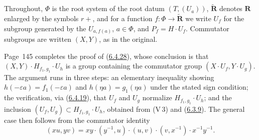 \documentclass[12pt,a4paper,oneside,english]{smfart}
\newcommand{\btref}[1]{\hyperlink{bt:#1}{#1}}
\theoremstyle{definition}
\theoremstyle{bt}
\begin{document}
\begingroup\linespread{1.06}
\providecommand{\bR}{}
\renewcommand{\bR}{\mathbf{R}}
\providecommand{\bN}{}
\renewcommand{\bN}{\mathbf{N}}
\providecommand{\bZ}{}
\renewcommand{\bZ}{\mathbf{Z}}
\providecommand{\bF}{}
\renewcommand{\bF}{\mathbf{F}}
\providecommand{\Rt}{}
\renewcommand{\Rt}{\widetilde{\bR}}
\providecommand{\Rtp}{}
\renewcommand{\Rtp}{\Rt_{+}}
\providecommand{\Ns}{}
\renewcommand{\Ns}{\bN^{*}}
\providecommand{\Cx}{}
\renewcommand{\Cx}{\mathscr{C}}
\providecommand{\Bldg}{}
\renewcommand{\Bldg}{\mathscr{I}}
\providecommand{\Phired}{}
\renewcommand{\Phired}{\Phi^{\mathrm{red}}}
\providecommand{\Wv}{}
\renewcommand{\Wv}{{}^{v}W}
\providecommand{\nuv}{}
\renewcommand{\nuv}{{}^{v}\nu}
\providecommand{\Sigmav}{}
\renewcommand{\Sigmav}{{}^{v}\Sigma}
\providecommand{\cl}{}
\renewcommand{\cl}{\operatorname{cl}}
\providecommand{\Hcl}{}
\renewcommand{\Hcl}[1]{H_{[#1]}}
\providecommand{\Hop}{}
\renewcommand{\Hop}[1]{H_{(#1)}}
\providecommand{\Bfr}{}
\renewcommand{\Bfr}{\mathfrak{B}}
\providecommand{\Ker}{}\renewcommand{\Ker}{\operatorname{Ker}}
\providecommand{\comm}{}
\renewcommand{\comm}[2]{(#1,#2)}
\providecommand{\cpl}{}
\renewcommand{\cpl}{\complement}
\newenvironment{bt}[2]%
  {\par\medskip\noindent\textbf{#1 (#2).}\ ---\ \begingroup\itshape}
  {\endgroup\par\medskip}
\newenvironment{btpar}[1]%
  {\par\medskip\noindent\textbf{(#1)}\ }
  {\par\medskip}
\newenvironment{sketch}
  {\par\smallskip\noindent\small\textit{Proof.}\ \ignorespaces}
  {\par\smallskip\normalsize}
\providecommand{\tnote}{}
\renewcommand{\tnote}[1]{\footnote{\emph{Translator's note.} #1}}
\bigskip



\noindent
Throughout, $\Phi$ is the root system of the root datum
$(T,(U_a))$, $\Rt$ denotes $\bR$ enlarged by the symbols $r+$, and for a
function $f:\Phi\to\Rt$ we write $U_f$ for the subgroup generated by the
$U_{a,f(a)}$, $a\in\Phi$, and $P_f=H\cdot U_f$. Commutator subgroups are
written $\comm{X}{Y}$, as in the original.

\medskip
Page~145 completes the proof of (\btref{6.4.28}), whose conclusion is that
$\comm{X}{Y}\cdot H_{f_1,g_1}\cdot U_h$ is a group containing the
commutator group $\comm{X\cdot U_f}{Y\cdot U_g}$. The argument runs in
three steps: an elementary inequality showing $h(-\varepsilon a)=f_1(-\varepsilon a)$
and $h(\eta a)=g_1(\eta a)$ under the stated sign condition; the
verification, via (\btref{6.4.19}), that $U_f$ and $U_g$ normalize
$H_{f_1,g_1}\cdot U_h$; and the inclusion
$\comm{U_f}{U_g}\subset H_{f_1,g_1}\cdot U_h$, obtained from (V\,3) and
(\btref{6.3.9}). The general case then follows from the commutator identity
\[
  (xu,yv)=xy\cdot(y^{-1},u)\cdot(u,v)\cdot(v,x^{-1})\cdot x^{-1}y^{-1}.
\]
\end{document}
